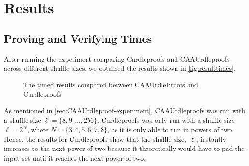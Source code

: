 \section{Results}\label{sec:results}
\subsection{Proving and Verifying Times}\label{subsec:results:provingverifying}

After running the experiment comparing Curdleproofs and CAAUrdleproofs across different shuffle sizes, we obtained the results shown in \autoref{fig:resulttimes}.

\begin{figure}[!htb]
    \centering
    \qquad
    \caption{The timed results compared between CAAUrdleProofs and Curdleproofs}%
    \label{fig:resulttimes}%
\end{figure}

As mentioned in \autoref{sec:CAAUrdleproof-experiment}, CAAUrdleproofs was run with a shuffle size $\ell=\{8,9,\dots,256\}$.
Curdleproofs was only run with a shuffle size $\ell = 2^N$, where $N = \{3,4,5,6,7,8\}$, as it is only able to run in powers of two.
Hence, the results for Curdleproofs show that the shuffle size,~$\ell$, instantly increases to the next power of two because it theoretically would have to pad the input set until it reaches the next power of two.

